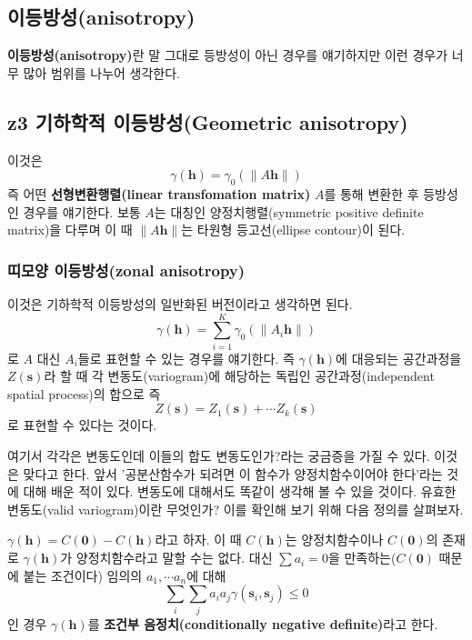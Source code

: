 \documentclass[b5paper,]{scrbook}
\theoremstyle{plain}
\theoremstyle{definition}
\numberwithin{equation}{section}
\begin{document}
\subsection{이등방성(anisotropy)}\label{anisotropy}

\textbf{이등방성(anisotropy)}란 말 그대로 등방성이 아닌 경우를
얘기하지만 이런 경우가 너무 많아 범위를 나누어 생각한다.

\subsection{z3 기하학적 이등방성(Geometric
anisotropy)}\label{z3--geometric-anisotropy}

이것은 \[\gamma(\mathbf{h})=\gamma_{0}(\|A\mathbf{h}\|)\] 즉 어떤
\textbf{선형변환행렬(linear transfomation matrix)} \(A\)를 통해 변환한
후 등방성인 경우를 얘기한다. 보통 \(A\)는 대칭인 양정치행렬(symmetric
positive definite matrix)을 다루며 이 때 \(\|A\mathbf{h}\|\)는 타원형
등고선(ellipse contour)이 된다.

\subsubsection{띠모양 이등방성(zonal
anisotropy)}\label{-zonal-anisotropy}

이것은 기하학적 이등방성의 일반화된 버전이라고 생각하면 된다.
\[\gamma(\mathbf{h})=\sum_{i=1}^{K}\gamma_{0}(\|A_{i}\mathbf{h}\|)\] 로
\(A\) 대신 \(A_{i}\)들로 표현할 수 있는 경우를 얘기한다. 즉
\(\gamma(\mathbf{h})\)에 대응되는 공간과정을 \(Z(\mathbf{s})\)라 할 때
각 변동도(variogram)에 해당하는 독립인 공간과정(independent spatial
process)의 합으로 즉
\[Z(\mathbf{s})=Z_{1}(\mathbf{s})+ \cdots Z_{k}(\mathbf{s})\] 로 표현할
수 있다는 것이다.

여기서 각각은 변동도인데 이들의 합도 변동도인가?라는 궁금증을 가질 수
있다. 이것은 맞다고 한다. 앞서 '공분산함수가 되려면 이 함수가
양정치함수이어야 한다'라는 것에 대해 배운 적이 있다. 변동도에 대해서도
똑같이 생각해 볼 수 있을 것이다. 유효한 변동도(valid variogram)이란
무엇인가? 이를 확인해 보기 위해 다음 정의를 살펴보자.

\(\gamma(\mathbf{h})=C(\mathbf{0})-C(\mathbf{h})\)라고 하자. 이 때
\(C(\mathbf{h})\)는 양정치함수이나 \(C(\mathbf{0})\)의 존재로
\(\gamma(\mathbf{h})\)가 양정치함수라고 말할 수는 없다. 대신
\(\sum a_{i}=0\)을 만족하는(\(C(\mathbf{0})\) 때문에 붙는 조건이다)
임의의 \(a_{1}, \cdots a_{n}\)에 대해
\[\sum_{i}\sum_{j}a_{i}a_{j}\gamma(\mathbf{s}_{i},\mathbf{s}_{j}) \leq 0\]
인 경우 \(\gamma(\mathbf{h})\)를 \textbf{조건부 음정치(conditionally
negative definite)}라고 한다.
\end{document}
